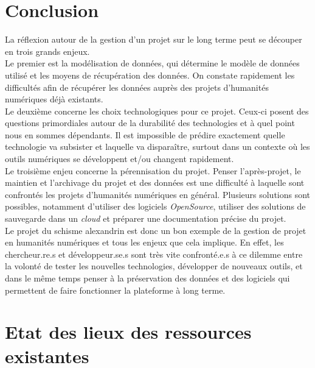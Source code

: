 \documentclass[a4paper,12pt,twoside]{book}
\begin{document}
    \chapter*{Conclusion}
	La réflexion autour de la gestion d’un projet sur le long terme peut se découper en trois grands enjeux.\\
Le premier est la modélisation de données, qui détermine le modèle de données utilisé et les moyens de récupération des données. On constate rapidement les difficultés afin de récupérer les données auprès des projets d’humanités numériques déjà existants.\\
Le deuxième concerne les choix technologiques pour ce projet. Ceux-ci posent des questions primordiales autour de la durabilité des technologies et à quel point nous en sommes dépendants. Il est impossible de prédire exactement quelle technologie va subsister et laquelle va disparaître, surtout dans un contexte où les outils numériques se développent et/ou changent rapidement.\\ 
Le troisième enjeu concerne la pérennisation du projet. Penser l’après-projet, le maintien et l’archivage du projet et des données est une difficulté à laquelle sont confrontés les projets d’humanités numériques en général. Plusieurs solutions sont possibles, notamment d’utiliser des logiciels \textit{OpenSource}, utiliser des solutions de sauvegarde dans un \textit{cloud} et préparer une documentation précise du projet.\\

Le projet du schisme alexandrin est donc un bon exemple de la gestion de projet en humanités numériques et tous les enjeux que cela implique. En effet, les chercheur.re.s et développeur.se.s sont très vite confronté.e.s à ce dilemme entre la volonté de tester les nouvelles technologies, développer de nouveaux outils, et dans le même temps penser à la préservation des données et des logiciels qui permettent de faire fonctionner la plateforme à long terme.
	
	\appendix

        \chapter[Etat de l'existant]{Etat des lieux des ressources existantes}
            \begin{landscape}
                 
            \end{landscape}
\end{document}
